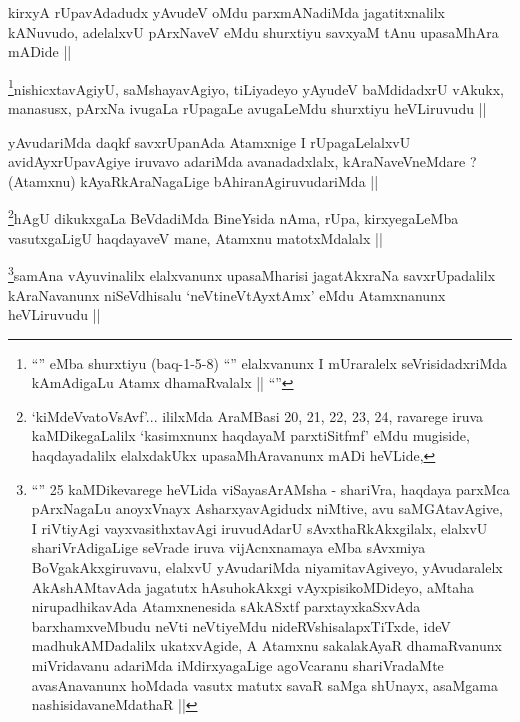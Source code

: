 \begin{artha}
kirxyA rUpavAdadudx yAvudeV oMdu parxmANadiMda jagatitxnalilx
kANuvudo, adelalxvU pArxNaveV eMdu shurxtiyu savxyaM tAnu upasaMhAra
mADide ||
\end{artha}

\begin{artha}
\footnote{``\stext'' eMba shurxtiyu (baq-1-5-8) ``\stext'' elalxvanunx
  I mUraralelx seVrisidadxriMda kAmAdigaLu Atamx dhamaRvalalx ||
  ``\stext''}nishicxtavAgiyU, saMshayavAgiyo, tiLiyadeyo yAyudeV
baMdidadxrU vAkukx, manasusx, pArxNa ivugaLa rUpagaLe avugaLeMdu
shurxtiyu heVLiruvudu ||
\end{artha}

\begin{artha}
yAvudariMda daqkf savxrUpanAda Atamxnige I rUpagaLelalxvU
avidAyxrUpavAgiye iruvavo adariMda avanadadxlalx, kAraNaveVneMdare ?
(Atamxnu) kAyaRkAraNagaLige bAhiranAgiruvudariMda ||
\end{artha}


\begin{artha}
\footnote{`kiMdeVvatoV\s sAvf'... ililxMda AraMBasi 20, 21, 22, 23,
  24, ravarege iruva kaMDikegaLalilx `kasimxnunx haqdayaM
  parxtiSitfmf' eMdu mugiside, haqdayadalilx elalxdakUkx
  upasaMhAravanunx mADi heVLide,}hAgU dikukxgaLa BeVdadiMda BineYsida nAma, rUpa,
kirxyegaLeMba vasutxgaLigU haqdayaveV mane, Atamxnu matotxMdalalx ||
\end{artha}


\begin{artha}
\footnote{``\stext'' 25 kaMDikevarege heVLida viSayasArAMsha -
  shariVra, haqdaya parxMca pArxNagaLu anoyxVnayx AsharxyavAgidudx
  niMtive, avu saMGAtavAgive, I riVtiyAgi vayxvasithxtavAgi
  iruvudAdarU sAvxthaRkAkxgilalx, elalxvU shariVrAdigaLige seVrade
  iruva vijAcnxnamaya eMba sAvxmiya BoVgakAkxgiruvavu, elalxvU
  yAvudariMda niyamitavAgiveyo, yAvudaralelx AkAshAMtavAda jagatutx
  hAsuhokAkxgi vAyxpisikoMDideyo, aMtaha nirupadhikavAda Atamxnenesida
  sAkASxtf parxtayxkaSxvAda barxhamxveMbudu neVti neVtiyeMdu
  nideRVshisalapxTiTxde, ideV madhukAMDadalilx ukatxvAgide, A Atamxnu
  sakalakAyaR dhamaRvanunx miVridavanu adariMda iMdirxyagaLige
  agoVcaranu shariVradaMte avasAnavanunx hoMdada vasutx matutx savaR
  saMga shUnayx, asaMgama nashisidavaneMdathaR ||}samAna vAyuvinalilx elalxvanunx upasaMharisi jagatAkxraNa
savxrUpadalilx kAraNavanunx niSeVdhisalu `neVtineVtAyxtAmx' eMdu
Atamxnanunx heVLiruvudu ||
\end{artha}

